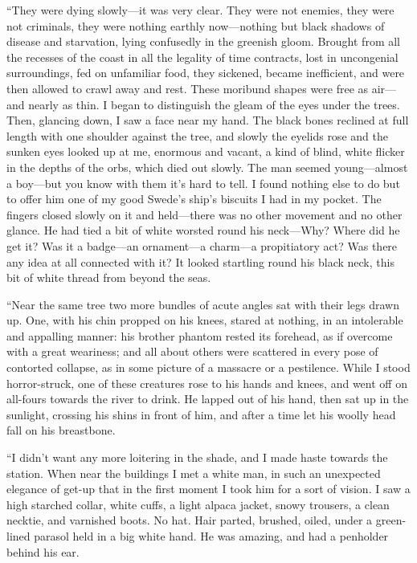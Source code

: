 \documentclass[12pt]{report}
\begin{document}
``They were dying slowly---it was very clear. They were not enemies,
they were not criminals, they were nothing earthly now---nothing but
black shadows of disease and starvation, lying confusedly in the
greenish gloom. Brought from all the recesses of the coast in all the
legality of time contracts, lost in uncongenial surroundings, fed on
unfamiliar food, they sickened, became inefficient, and were then
allowed to crawl away and rest. These moribund shapes were free as
air---and nearly as thin. I began to distinguish the gleam of the eyes
under the trees. Then, glancing down, I saw a face near my hand. The
black bones reclined at full length with one shoulder against the tree,
and slowly the eyelids rose and the sunken eyes looked up at me,
enormous and vacant, a kind of blind, white flicker in the depths of the
orbs, which died out slowly. The man seemed young---almost a boy---but
you know with them it's hard to tell. I found nothing else to do but to
offer him one of my good Swede's ship's biscuits I had in my pocket. The
fingers closed slowly on it and held---there was no other movement and
no other glance. He had tied a bit of white worsted round his
neck---Why? Where did he get it? Was it a badge---an ornament---a
charm---a propitiatory act? Was there any idea at all connected with it?
It looked startling round his black neck, this bit of white thread from
beyond the seas.

``Near the same tree two more bundles of acute angles sat with their
legs drawn up. One, with his chin propped on his knees, stared at
nothing, in an intolerable and appalling manner: his brother phantom
rested its forehead, as if overcome with a great weariness; and all
about others were scattered in every pose of contorted collapse, as in
some picture of a massacre or a pestilence. While I stood horror-struck,
one of these creatures rose to his hands and knees, and went off on
all-fours towards the river to drink. He lapped out of his hand, then
sat up in the sunlight, crossing his shins in front of him, and after a
time let his woolly head fall on his breastbone.

``I didn't want any more loitering in the shade, and I made haste
towards the station. When near the buildings I met a white man, in such
an unexpected elegance of get-up that in the first moment I took him for
a sort of vision. I saw a high starched collar, white cuffs, a light
alpaca jacket, snowy trousers, a clean necktie, and varnished boots. No
hat. Hair parted, brushed, oiled, under a green-lined parasol held in a
big white hand. He was amazing, and had a penholder behind his ear.
\end{document}
